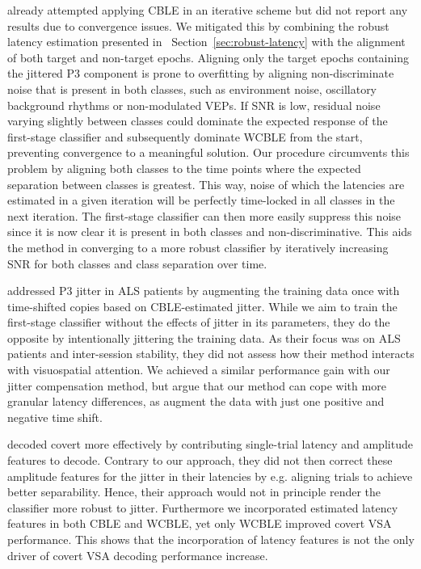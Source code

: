 \cite{Thompson2012} already attempted applying CBLE in an iterative scheme
but did not report any results due to convergence issues.
We mitigated this by combining the robust latency estimation presented in
~Section~\ref{sec:robust-latency} with the alignment of both target and non-target
epochs.
Aligning only the target epochs containing the jittered P3 component is prone to
overfitting by aligning non-discriminate noise that is present in both
classes, such as environment noise, oscillatory background rhythms or
non-modulated VEPs.
If SNR is low, residual noise varying slightly between classes could dominate
the expected response of the first-stage classifier and subsequently dominate
WCBLE from the start, preventing convergence to a meaningful solution.
Our procedure circumvents this problem by aligning both classes to the time
points where the expected separation between classes is greatest.
This way, noise of which the latencies are estimated in a given iteration will be
perfectly time-locked in all classes in the next
iteration.
The first-stage classifier can then more easily suppress this noise since it is
now clear it is present in both classes and non-discriminative.
This aids the method in converging to a more robust classifier by iteratively
increasing SNR for both classes and class separation over time.

\cite{Zisk2022} addressed P3 jitter in ALS patients by augmenting the training data once
with time-shifted copies based on CBLE-estimated jitter.
While we aim to train the first-stage classifier without the effects of jitter
in its parameters, they do the opposite by intentionally jittering the
training data.
As their focus was on ALS patients and inter-session stability, they
did not assess how their method interacts with visuospatial attention.
We achieved a similar performance gain with our jitter compensation method, but
argue that our method can cope with more granular latency differences, as
\cite{Zisk2022} augment the data with just one positive and negative time
shift.

\textcite{Hardiansyah2020} decoded covert \textcite{vsa} more effectively by
contributing single-trial latency and amplitude features to decode.
Contrary to our approach, they did not then correct these amplitude
features for the jitter in their latencies by e.g. aligning trials to achieve
better separability.
Hence, their approach would not in principle render the classifier more robust
to jitter.
Furthermore we incorporated estimated latency features in both CBLE and WCBLE,
yet only WCBLE improved covert VSA performance.
This shows that the incorporation of latency features is not the only driver of
covert VSA decoding performance increase.

